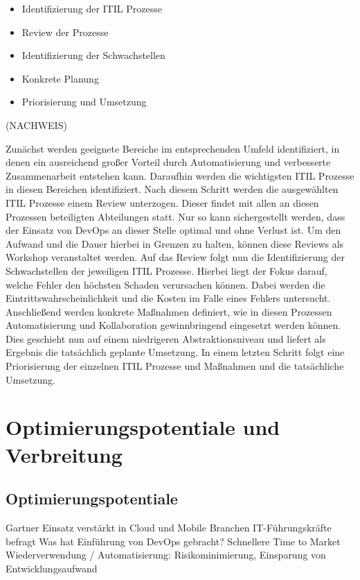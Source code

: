\begin{itemize}
\item Identifizierung der ITIL Prozesse
\item Review der Prozesse
\item Identifizierung der Schwachstellen
\item Konkrete Planung
\item Priorisierung und Umsetzung
\end{itemize}

(NACHWEIS)

Zunächst werden geeignete Bereiche im entsprechenden Umfeld identifiziert, in denen ein ausreichend großer Vorteil durch Automatisierung und verbesserte Zusammenarbeit entstehen kann. Daraufhin werden die wichtigsten ITIL Prozesse in diesen Bereichen identifiziert. Nach diesem Schritt werden die ausgewählten ITIL Prozesse einem Review unterzogen. Dieser findet mit allen an diesen Prozessen beteiligten Abteilungen statt. Nur so kann sichergestellt werden, dass der Einsatz von DevOps an dieser Stelle optimal und ohne Verlust ist. Um den Aufwand und die Dauer hierbei in Grenzen zu halten, können diese Reviews als Workshop veranstaltet werden. Auf das Review folgt nun die Identifizierung der Schwachstellen der jeweiligen ITIL Prozesse. Hierbei liegt der Fokus darauf, welche Fehler den höchsten Schaden verursachen können. Dabei werden die Eintrittswahrscheinlichkeit und die Kosten im Falle eines Fehlers untersucht. Anschließend werden konkrete Maßnahmen definiert, wie in diesen Prozessen Automatisierung und Kollaboration gewinnbringend eingesetzt werden können. Dies geschieht nun auf einem niedrigeren Abstraktionsniveau und liefert als Ergebnis die tatsächlich geplante Umsetzung. In einem letzten Schritt folgt eine Priorisierung der einzelnen ITIL Prozesse und Maßnahmen und die tatsächliche Umsetzung.


\section{Optimierungspotentiale und Verbreitung} %

\subsection{Optimierungspotentiale}
Gartner
Einsatz verstärkt in Cloud und Mobile Branchen
IT-Führungskräfte befragt
Was hat Einführung von DevOps gebracht?
Schnellere Time to Market
Wiederverwendung / Automatisierung: Risikominimierung, Einsparung von Entwicklungsaufwand


